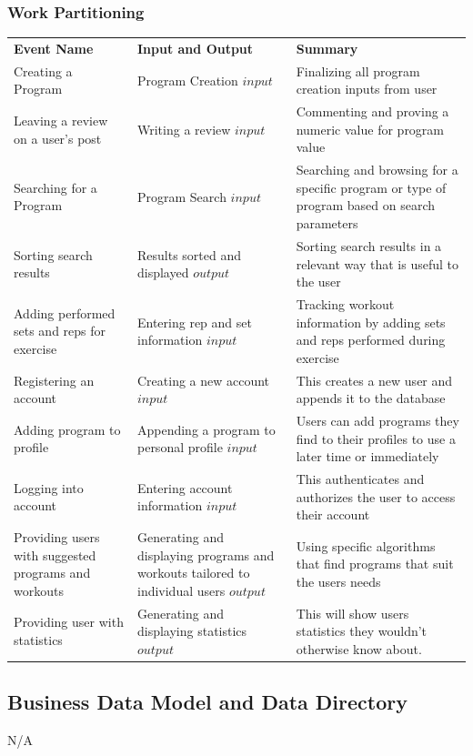 \documentclass[12pt]{article}
\begin{document}
\subsubsection{Work Partitioning}
\begin{center}
\begin{tabular}{ |p{5cm}|p{5cm}|p{5cm}| } 
 \hline
 \textbf{Event Name} & \textbf{Input and Output} & \textbf{Summary} \\ 
 Creating a Program  & Program Creation \(input\) & Finalizing all program creation inputs from user  \\ 
 Leaving a review on a user's post & Writing a review \(input\) & Commenting and proving a numeric value for program value \\
 Searching for a Program & Program Search \(input\) & Searching and browsing for a specific program or type of program based on search parameters  \\ 
 Sorting search results & Results sorted and displayed \(output\) & Sorting search results in a relevant way that is useful to the user \\ 
 Adding performed sets and reps for exercise & Entering rep and set information \(input\) & Tracking workout information by adding sets and reps performed during exercise \\ 
 Registering an account & Creating a new account \(input\) & This creates a new user and appends it to the database \\ 
 Adding program to profile  & Appending a program to personal profile \(input\) & Users can add programs they find to their profiles to use a later time or immediately \\ 
 Logging into account & Entering account information \(input\) & This authenticates and authorizes the user to access their account  \\ 
 Providing users with suggested programs and workouts & Generating and displaying programs and workouts tailored to individual users \(output\) & Using specific algorithms that find programs that suit the users needs \\ 
 Providing user with statistics & Generating and displaying statistics \(output\) & This will show users statistics they wouldn't otherwise know about. \\ 
 \hline
\end{tabular}
\end{center}
\subsection{Business Data Model and Data Directory}
N/A
\end{document}
